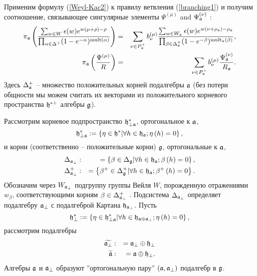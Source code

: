 Применим формулу  (\ref{Weyl-Kac2}) к правилу ветвления (\ref{branching1}) и получим соотношение, связывающее сингулярные элементы
 $\Psi ^{\left( \mu \right) }$ and $\Psi _{ \mathfrak{a}}^{\left( \nu \right) }$ :
\begin{eqnarray}
\nonumber
\pi _{\af}\left( \frac{\sum_{w \in W}\epsilon (w )e^{w
(\mu +\rho )-\rho }}{\prod_{\alpha \in \Delta ^{+}}(1-e^{-\alpha })^{\mathrm{%
mult}(\alpha )}}\right) &=&\sum_{\nu \in P_{\af}^{+}}b_{\nu }^{(\mu )}%
\frac{\sum_{w \in W_{\af}}\epsilon (w )e^{w (\nu +\rho _{%
\af})-\rho _{\af}}}{\prod_{\beta \in \Delta _{\af%
}^{+}}(1-e^{-\beta })^{\mathrm{mult}_{\af}(\beta )}},  \label{eq:124} \\
\pi _{\af}\left( \frac{\Psi ^{\left( \mu \right) }}{R}\right)
&=&\sum_{\nu \in P_{\af}^{+}}b_{\nu }^{(\mu )}\frac{\Psi _{ \frak{%
a}}^{\left( \nu \right) }}{R_{\af}}.
\end{eqnarray}
Здесь $\Delta _{\mathfrak{a}}^{+}$ -- множество положительных корней подалгебры $\mathfrak{a}$ (без потери общности мы можем считать их векторами из положительного корневого пространства  $\mathfrak{h}^{\ast  +}$ алгебры $\mathfrak{g}$).

Рассмотрим корневое подпространство $\mathfrak{h}_{\perp \mathfrak{a}}^{\ast }$, ортогональное к  $\mathfrak{a}$,
\begin{equation*}
\mathfrak{h}_{\perp \mathfrak{a}}^{\ast }:=\left\{ \eta \in \mathfrak{h}^{\ast }
|\forall h \in \mathfrak{h}_{\mathfrak{a}};  \eta\left(h \right)=0 \right\} ,
\end{equation*}
и корни (соответственно -- положительные корни)  $\mathfrak{g}$, ортогональные
к $\mathfrak{a}$,
\begin{eqnarray}
\label{delta-a-ort}
\Delta _{\af_{\perp }} &:&=\left\{ \beta \in \Delta _{\gf}|
\forall h \in \hf_{\af};  \beta\left(h \right)=0  \right\} , \\
\Delta _{\af_{\perp }}^{+} &:&=\left\{ \beta ^{+}\in \Delta _{\gf%
}^{+}|\forall h \in \hf_{\af};  \beta^{+}\left(h \right)=0  \right\} .
\end{eqnarray}
Обозначим через $W_{\mathfrak{a}_{\perp}}$ подгруппу группы Вейля $W$, порожденную отражениями $w _{\beta }$, соответствующими корням $\beta \in \Delta _{\mathfrak{a}_{\perp}}^{+}$ . Подсистема  $\Delta _{\mathfrak{a}_{\perp }}$ определяет подалгебру $\mathfrak{a}_{\perp }$ с подалгеброй Картана $\mathfrak{h}_{\mathfrak{a}_{\perp}}$. Пусть
\begin{equation*}
\mathfrak{h}_{\perp }^{\ast }:=\left\{ \eta \in \mathfrak{h}_{\perp \mathfrak{a}}^{\ast
}|\forall h \in \mathfrak{h}_{\mathfrak{a}\oplus \mathfrak{a}_{\perp}}; \eta \left( h \right)=0 \right\},
\end{equation*}
рассмотрим подалгебры
\begin{eqnarray*}
\widetilde{\mathfrak{a}_{\perp }} &:&=\mathfrak{a}_{\perp }\oplus \mathfrak{h}_{\perp }
\\
\widetilde{\mathfrak{a}} &:&=\mathfrak{a}\oplus \mathfrak{h}_{\perp }.
\end{eqnarray*}
Алгебры $\mathfrak{a}$ и $\mathfrak{a}_{\perp }$ образуют ''ортогональную пару''
$\left( \mathfrak{a},\mathfrak{a}_{\perp}\right)$ подалгебр в  $\mathfrak{g}$.

